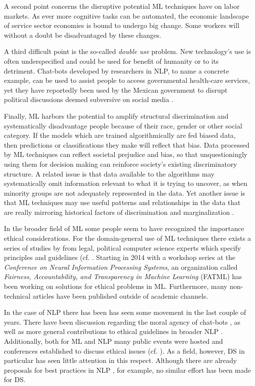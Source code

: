 \documentclass{article}
\begin{document}
A second point concerns the disruptive potential ML techniques have on labor markets. As ever more cognitive tasks can be automated, the economic landscape of service sector economies is bound to undergo big change. Some workers will without a doubt be disadvantaged by these changes. 

A third difficult point is the so-called \emph{double use} problem. New technology's use is often underspecified and could be used for benefit of humanity or to its detriment. Chat-bots developed by researchers in NLP, to name a concrete example, can be used to assist people to access governmental health-care services, yet they have reportedly been used by the Mexican government to disrupt political discussions deemed subversive on social media \cite{leidner2017ethical}.

Finally, ML harbors the potential to amplify structural discrimination and systematically disadvantage people because of their race, gender or other social category. If the models which are trained algorithmically are fed biased data, then predictions or classifications they make will reflect that bias.
Data processed by ML techniques can reflect societal prejudice and bias, so that unquestioningly using them for decision making can reinforce society's existing discriminatory structure. A related issue is that data available to the algorithms may systematically omit information relevant to what it is trying to uncover, as when minority groups are not adequately represented in the data. Yet another issue is that ML techniques may use useful patterns and relationships in the data that are really mirroring historical factors of discrimination and marginalization \cite{barocas2016big}.


In the broader field of ML some people seem to have recognized the importance ethical considerations. For the domain-general use of ML techniques there exists a series of studies by from legal, political computer science experts which specify principles and guidelines (cf. \cite{pasquale2015black}\cite{feldman2015certifying}\cite{barocas2016big}. Starting in 2014 with a workshop series at the \emph{Conference on Neural Information Processing Systems}, an organization called \emph{Fairness, Accountability, and Transparency in Machine Learning} (FATML) has been working on solutions for ethical problems in ML. Furthermore, many non-technical articles have been published outside of academic channels. 

In the case of NLP there has been  has seen some movement in the last couple of years. There have been discussion regarding the moral agency of chat-bots \cite{thieltges2016devil}, as well as more general contributions to ethical guidelines in broader NLP \cite{hovy2016social}.
Additionally, both for ML and NLP many public events were hosted and conferences established to discuss ethical issues (cf. \cite{conferences}).
As a field, however, DS in particular has seen little attention in this respect. Although there are already proposals for best practices in NLP \cite{leidner2017ethical}, for example, no similar effort has been made for DS.
\end{document}
